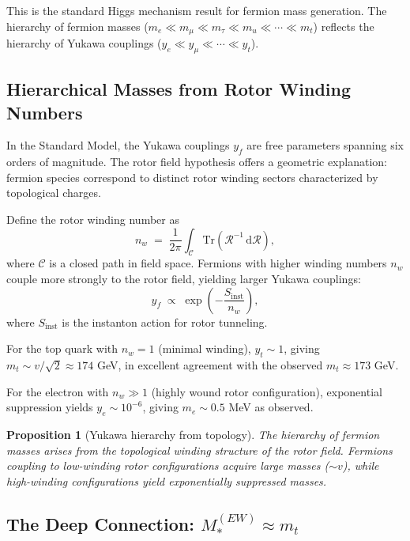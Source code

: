 \documentclass[11pt,a4paper]{article}
\newcommand{\Rotor}{\mathcal{R}}
\theoremstyle{definition}
\theoremstyle{plain}
\newtheorem{proposition}{Proposition}
\theoremstyle{remark}
\begin{document}
This is the standard Higgs mechanism result for fermion mass generation. The hierarchy of fermion masses ($m_e \ll m_\mu \ll m_\tau \ll m_u \ll \cdots \ll m_t$) reflects the hierarchy of Yukawa couplings ($y_e \ll y_\mu \ll \cdots \ll y_t$).

\subsection{Hierarchical Masses from Rotor Winding Numbers}

In the Standard Model, the Yukawa couplings $y_f$ are free parameters spanning six orders of magnitude. The rotor field hypothesis offers a geometric explanation: fermion species correspond to distinct rotor winding sectors characterized by topological charges.

Define the rotor winding number as
\begin{equation}
  n_w \;=\; \frac{1}{2\pi}\int_{\mathcal{C}} \mathrm{Tr}\left(\Rotor^{-1}\,\mathrm{d}\Rotor\right),
\end{equation}
where $\mathcal{C}$ is a closed path in field space. Fermions with higher winding numbers $n_w$ couple more strongly to the rotor field, yielding larger Yukawa couplings:
\begin{equation}
  y_f \;\propto\; \exp\!\left(-\frac{S_{\text{inst}}}{n_w}\right),
\end{equation}
where $S_{\text{inst}}$ is the instanton action for rotor tunneling.

For the top quark with $n_w = 1$ (minimal winding), $y_t \sim 1$, giving $m_t \sim v/\sqrt{2} \approx 174$ GeV, in excellent agreement with the observed $m_t \approx 173$ GeV.

For the electron with $n_w \gg 1$ (highly wound rotor configuration), exponential suppression yields $y_e \sim 10^{-6}$, giving $m_e \sim 0.5$ MeV as observed.

\begin{proposition}[Yukawa hierarchy from topology]
The hierarchy of fermion masses arises from the topological winding structure of the rotor field. Fermions coupling to low-winding rotor configurations acquire large masses ($\sim v$), while high-winding configurations yield exponentially suppressed masses.
\end{proposition}

\subsection{The Deep Connection: $M_*^{(EW)} \approx m_t$}
\end{document}
